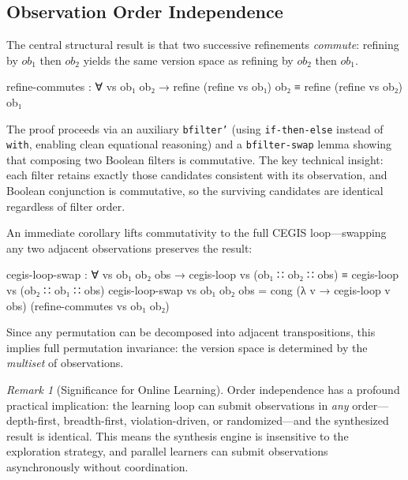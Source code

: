 \documentclass[9pt,a4paper]{article}
\theoremstyle{plain}
\theoremstyle{definition}
\theoremstyle{remark}
\newtheorem{remark}{Remark}
\begin{document}
\subsection{Observation Order Independence}
\label{sec:refine-commutes}

The central structural result is that two successive refinements \emph{commute}: refining by $\mathit{ob}_1$ then $\mathit{ob}_2$ yields the same version space as refining by $\mathit{ob}_2$ then $\mathit{ob}_1$.

\begin{spec}
    refine-commutes : ∀ vs ob₁ ob₂ →
      refine (refine vs ob₁) ob₂ ≡ refine (refine vs ob₂) ob₁
\end{spec}

\noindent The proof proceeds via an auxiliary \texttt{bfilter'} (using \texttt{if-then-else} instead of \texttt{with}, enabling clean equational reasoning) and a \texttt{bfilter-swap} lemma showing that composing two Boolean filters is commutative.  The key technical insight: each filter retains exactly those candidates consistent with its observation, and Boolean conjunction is commutative, so the surviving candidates are identical regardless of filter order.

An immediate corollary lifts commutativity to the full CEGIS loop---swapping any two adjacent observations preserves the result:

\begin{spec}
    cegis-loop-swap : ∀ vs ob₁ ob₂ obs →
      cegis-loop vs (ob₁ ∷ ob₂ ∷ obs)
        ≡ cegis-loop vs (ob₂ ∷ ob₁ ∷ obs)
    cegis-loop-swap vs ob₁ ob₂ obs =
      cong (λ v → cegis-loop v obs) (refine-commutes vs ob₁ ob₂)
\end{spec}

\noindent Since any permutation can be decomposed into adjacent transpositions, this implies full permutation invariance: the version space is determined by the \emph{multiset} of observations.

\begin{remark}[Significance for Online Learning]
Order independence has a profound practical implication: the learning loop can submit observations in \emph{any} order---depth-first, breadth-first, violation-driven, or randomized---and the synthesized result is identical.
This means the synthesis engine is insensitive to the exploration strategy, and parallel learners can submit observations asynchronously without coordination.
\end{remark}
\end{document}
